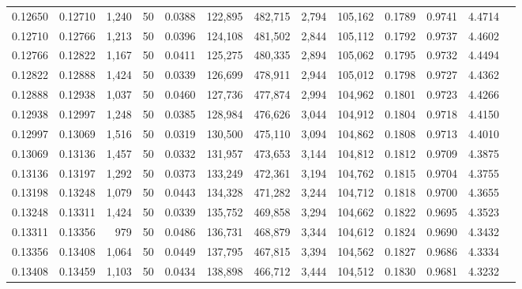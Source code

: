 \begin{tabular}{rrrrrrrrrrrrr}
0.12650 & 0.12710 & 1,240 &  50 &                                     0.0388 & 122,895 & 482,715 &   2,794 & 105,162 & 0.1789 & 0.9741 & 4.4714 \\
0.12710 & 0.12766 & 1,213 &  50 &                                     0.0396 & 124,108 & 481,502 &   2,844 & 105,112 & 0.1792 & 0.9737 & 4.4602 \\
0.12766 & 0.12822 & 1,167 &  50 &                                     0.0411 & 125,275 & 480,335 &   2,894 & 105,062 & 0.1795 & 0.9732 & 4.4494 \\
0.12822 & 0.12888 & 1,424 &  50 &                                     0.0339 & 126,699 & 478,911 &   2,944 & 105,012 & 0.1798 & 0.9727 & 4.4362 \\
0.12888 & 0.12938 & 1,037 &  50 &                                     0.0460 & 127,736 & 477,874 &   2,994 & 104,962 & 0.1801 & 0.9723 & 4.4266 \\
0.12938 & 0.12997 & 1,248 &  50 &                                     0.0385 & 128,984 & 476,626 &   3,044 & 104,912 & 0.1804 & 0.9718 & 4.4150 \\
0.12997 & 0.13069 & 1,516 &  50 &                                     0.0319 & 130,500 & 475,110 &   3,094 & 104,862 & 0.1808 & 0.9713 & 4.4010 \\
0.13069 & 0.13136 & 1,457 &  50 &                                     0.0332 & 131,957 & 473,653 &   3,144 & 104,812 & 0.1812 & 0.9709 & 4.3875 \\
0.13136 & 0.13197 & 1,292 &  50 &                                     0.0373 & 133,249 & 472,361 &   3,194 & 104,762 & 0.1815 & 0.9704 & 4.3755 \\
0.13198 & 0.13248 & 1,079 &  50 &                                     0.0443 & 134,328 & 471,282 &   3,244 & 104,712 & 0.1818 & 0.9700 & 4.3655 \\
0.13248 & 0.13311 & 1,424 &  50 &                                     0.0339 & 135,752 & 469,858 &   3,294 & 104,662 & 0.1822 & 0.9695 & 4.3523 \\
0.13311 & 0.13356 &   979 &  50 &                                     0.0486 & 136,731 & 468,879 &   3,344 & 104,612 & 0.1824 & 0.9690 & 4.3432 \\
0.13356 & 0.13408 & 1,064 &  50 &                                     0.0449 & 137,795 & 467,815 &   3,394 & 104,562 & 0.1827 & 0.9686 & 4.3334 \\
0.13408 & 0.13459 & 1,103 &  50 &                                     0.0434 & 138,898 & 466,712 &   3,444 & 104,512 & 0.1830 & 0.9681 & 4.3232 \\

\end{tabular}
